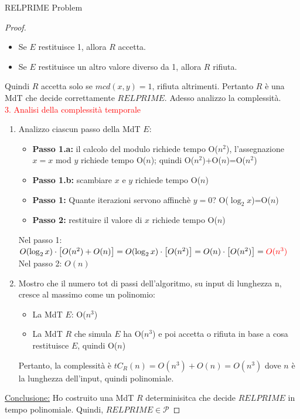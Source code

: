 \documentclass{article}  %
\theoremstyle{definition}
\begin{document}
\begin{theorem}{RELPRIME Problem}
\begin{proof}
\begin{enumerate}
			      \begin{itemize}
				      \item Se $E$ restituisce 1, allora $R$ accetta.
				      \item Se $E$ restituisce un altro valore diverso da 1, allora $R$ rifiuta.
			      \end{itemize}
		\end{enumerate}
		Quindi $R$ accetta solo se $mcd(x,y)=1$, rifiuta altrimenti. Pertanto $R$ è una MdT che decide correttamente $RELPRIME$. Adesso analizzo la complessità. \\
		\textcolor{red}{3. Analisi della complessità temporale}
		\begin{enumerate}
			\item Analizzo ciascun passo della MdT $E$:
			      \begin{itemize}
				      \item \textbf{Passo 1.a:} il calcolo del modulo richiede tempo O($n^2$), l'assegnazione $x=x$ mod $y$ richiede tempo O($n$); quindi O($n^2$)+O($n$)=O($n^2$)
				      \item \textbf{Passo 1.b:} scambiare $x$ e $y$ richiede tempo O($n$)
				      \item \textbf{Passo 1:} Quante iterazioni servono affinchè $y=0$? O($\log_2x$)=O($n$)
				      \item \textbf{Passo 2:} restituire il valore di $x$ richiede tempo O($n$)
			      \end{itemize}
			      Nel passo 1: $O(\log_2x)\cdot\big[O(n^2)+O(n)\big]=O(\log_2x)\cdot\big[O(n^2)\big]=O(n)\cdot\big[O(n^2)\big]=\textcolor{red}{O(n^3)}$ \\
			      Nel passo 2: $O(n)$
			\item Mostro che il numero tot di passi dell'algoritmo, su input di lunghezza n, cresce
			      al massimo come un polinomio:
			      \begin{itemize}
				      \item La MdT $E$: O($n^3$)
				      \item La MdT $R$ che simula $E$ ha O($n^3$) e poi accetta o rifiuta in base a cosa restituisce $E$, quindi O($n$)
			      \end{itemize}
			      Pertanto, la complessità è $tC_R(n)=O(n^3)+O(n)=O(n^3)$ dove $n$ è la lunghezza dell'input, quindi polinomiale.
		\end{enumerate}
		\underline{Conclusione:} Ho costruito una MdT $R$ determinisitca che decide $RELPRIME$ in tempo polinomiale. Quindi, $RELPRIME \in \mathcal{P}$
	\end{proof}
\end{theorem}
\end{document}
